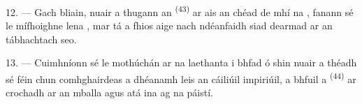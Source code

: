 12. --- Gach bliain, nuair a thugann an  \textsuperscript{(43)} ar
ais an chéad  de mhí na , fanann sé le mífhoighne lena
, mar tá a fhios aige nach ndéanfaidh siad dearmad ar an
 tábhachtach seo.

13. --- Cuimhníonn sé le mothúchán ar na laethanta i bhfad ó shin nuair a théadh sé
féin chun comhghairdeas a dhéanamh leis an  cáiliúil
impiriúil, a bhfuil a  \textsuperscript{(44)} ar crochadh ar an
mballa agus atá ina  ag na páistí.
\VUsaut{6.0mm}
\VUfilet{22mm}
